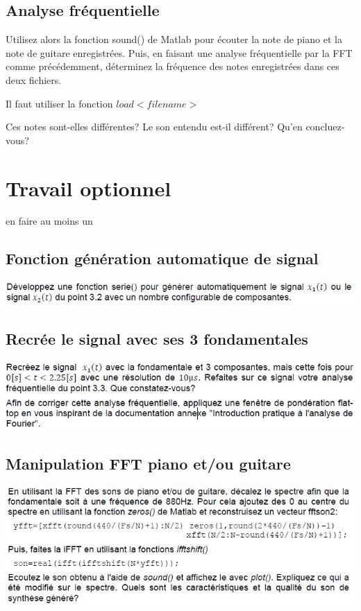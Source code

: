 \subsection{Analyse fréquentielle}
Utilisez alors la fonction sound() de Matlab pour écouter la note de piano et la note de guitare enregistrées. Puis, en faisant une analyse fréquentielle par la FFT comme précédemment, déterminez la fréquence des notes enregistrées dans ces deux fichiers. 

Il faut utiliser la fonction $load <filename>$

Ces notes sont-elles différentes? Le son entendu est-il différent? Qu'en concluez-vous?





\newpage
\section{Travail optionnel}
en faire au moins un
\subsection{Fonction génération automatique de signal}
\includegraphics[scale=.8]{Img/o1.JPG}


\subsection{Recrée le signal avec ses 3 fondamentales}
\includegraphics[scale=.8]{Img/o2.JPG}

\subsection{Manipulation FFT piano et/ou guitare}
\includegraphics[scale=.8]{Img/o3.JPG}

